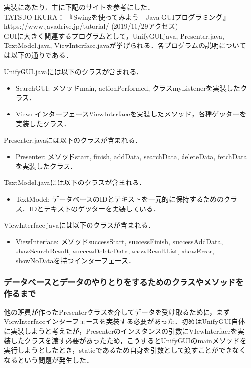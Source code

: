 \documentclass[12pt]{jarticle}
\begin{document}
実装にあたり，主に下記のサイトを参考にした． \\

TATSUO IKURA： 『Swingを使ってみよう - Java GUIプログラミング』 https://www.javadrive.jp/tutorial/ (2019/10/29アクセス) \\

GUIに大きく関連するプログラムとして，UnifyGUI.java, Presenter.java, TextModel.java, ViewInterface.javaが挙げられる．各プログラムの説明については以下の通りである．

UnifyGUI.javaには以下のクラスが含まれる．
\begin{itemize}
\item SearchGUI: メソッドmain, actionPerformed, クラスmyListenerを実装したクラス．
\item View: インターフェースViewInterfaceを実装したメソッド，各種ゲッターを実装したクラス．
\end{itemize}

Presenter.javaには以下のクラスが含まれる．
\begin{itemize}
\item Presenter: メソッドstart, finish, addData, searchData, deleteData, fetchDataを実装したクラス．
\end{itemize}

TextModel.javaには以下のクラスが含まれる．
\begin{itemize}
\item TextModel: データベースのIDとテキストを一元的に保持するためのクラス．IDとテキストのゲッターを実装している．
\end{itemize}

ViewInterface.javaには以下のクラスが含まれる．
\begin{itemize}
\item ViewInterface: メソッドsuccessStart, successFinish, successAddData, showSearchResult, successDeleteData, showResultList, showError, showNoDataを持つインターフェース．
\end{itemize}

\subsubsection{データベースとデータのやりとりをするためのクラスやメソッドを作るまで}
他の班員が作ったPresenterクラスを介してデータを受け取るために，まずViewInterfaceインターフェースを実装する必要があった．初めはUnifyGUI自体に実装しようと考えたが，Presenterのインスタンスの引数にVIewInterfaceを実装したクラスを渡す必要があったため，こうするとUnifyGUIのmainメソッドを実行しようとしたとき，staticであるため自身を引数として渡すことができなくなるという問題が発生した．
\end{document}
